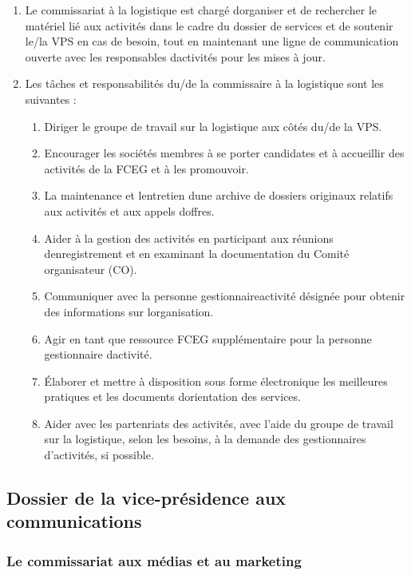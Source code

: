 \begin{enumerate}
 \item
  Le commissariat à la logistique est chargé d\textquotesingle organiser et de rechercher le matériel lié aux activités dans le cadre du dossier de services et de soutenir le/la VPS en cas de besoin, tout en maintenant une ligne de communication ouverte avec les responsables d\textquotesingle activités pour les mises à jour.
 \item
  Les tâches et responsabilités du/de la commissaire à la logistique sont les suivantes :

  \begin{enumerate}
   \item
    Diriger le groupe de travail sur la logistique aux côtés du/de la VPS.
   \item
    Encourager les sociétés membres à se porter candidates et à accueillir des activités de la FCEG et à les promouvoir.
   \item
    La maintenance et l\textquotesingle entretien d\textquotesingle une archive de dossiers originaux relatifs aux activités et aux appels d\textquotesingle offres.
   \item
    Aider à la gestion des activités en participant aux réunions d\textquotesingle enregistrement et en examinant la documentation du Comité organisateur (CO).
   \item
    Communiquer avec la personne gestionnaireactivité désignée pour obtenir des informations sur l\textquotesingle organisation.
   \item
    Agir en tant que ressource FCEG supplémentaire pour la personne gestionnaire d\textquotesingle activité.
   \item
    Élaborer et mettre à disposition sous forme électronique les meilleures pratiques et les documents d\textquotesingle orientation des services.
   \item
    Aider avec les partenriats des activités, avec l’aide du groupe de travail sur la logistique, selon les besoins, à la demande des gestionnaires d’activités, si possible.
  \end{enumerate}
\end{enumerate}

\subsection{Dossier de la vice-présidence aux communications}
\label{portefeuille-vpc}

\subsubsection{Le commissariat aux médias et au marketing}
\label{le-commissariat-aux-medias-et-au-marketing}

